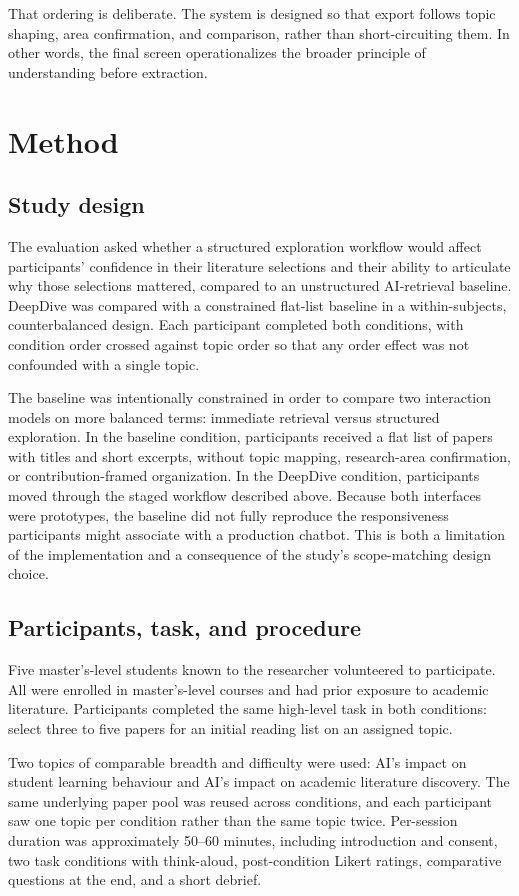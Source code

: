 \documentclass[manuscript,screen]{acmart}
\begin{document}
That ordering is deliberate. The system is designed so that export follows topic shaping, area confirmation, and comparison, rather than short-circuiting them. In other words, the final screen operationalizes the broader principle of understanding before extraction.

\section{Method}
\subsection{Study design}
The evaluation asked whether a structured exploration workflow would affect participants' confidence in their literature selections and their ability to articulate why those selections mattered, compared to an unstructured AI-retrieval baseline. DeepDive was compared with a constrained flat-list baseline in a within-subjects, counterbalanced design. Each participant completed both conditions, with condition order crossed against topic order so that any order effect was not confounded with a single topic.

The baseline was intentionally constrained in order to compare two interaction models on more balanced terms: immediate retrieval versus structured exploration. In the baseline condition, participants received a flat list of papers with titles and short excerpts, without topic mapping, research-area confirmation, or contribution-framed organization. In the DeepDive condition, participants moved through the staged workflow described above. Because both interfaces were prototypes, the baseline did not fully reproduce the responsiveness participants might associate with a production chatbot. This is both a limitation of the implementation and a consequence of the study's scope-matching design choice.

\subsection{Participants, task, and procedure}
Five master's-level students known to the researcher volunteered to participate. All were enrolled in master's-level courses and had prior exposure to academic literature. Participants completed the same high-level task in both conditions: select three to five papers for an initial reading list on an assigned topic.

Two topics of comparable breadth and difficulty were used: AI's impact on student learning behaviour and AI's impact on academic literature discovery. The same underlying paper pool was reused across conditions, and each participant saw one topic per condition rather than the same topic twice. Per-session duration was approximately 50--60 minutes, including introduction and consent, two task conditions with think-aloud, post-condition Likert ratings, comparative questions at the end, and a short debrief.
\end{document}
